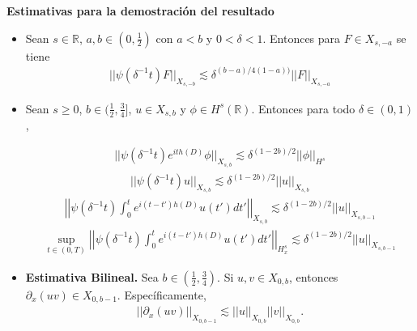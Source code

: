 \documentclass[a0,portrait]{a0poster}
\begin{document}
\begin{multicols}{2}
{{{\begin{minipage}{.93\columnwidth}
\textbf{Estimativas para la demostración del resultado}
\begin{itemize}
    \item Sean $s \in \mathbb{R}$, $a,b \in (0,\frac{1}{2})$ con $a<b$ y $0<\delta<1$. Entonces para $F \in X_{s,-a}$ se tiene
    \begin{align*}
        ||\psi(\delta^{-1}t)F||_{X_{s,-b}} \lesssim \delta^{(b-a)/4(1-a))}||F||_{X_{s,-a}}
    \end{align*}

    \item Sean $s \geq 0$, $b \in (\frac{1}{2},\frac{3}{4}]$, $u\in X_{s,b}$ y $\phi \in H^s(\mathbb{R})$. Entonces para todo $\delta \in (0,1)$,
    
    \begin{multicols}{2}
    {\small
        \begin{align*}
            ||\psi(\delta^{-1}t)e^{ith(D)}\phi||_{X_{s,b}} \lesssim \delta^{(1-2b)/2}||\phi||_{H^s}
        \end{align*}
        \begin{align*}
            ||\psi(\delta^{-1}t)u||_{X_{s,b}} \lesssim \delta^{(1-2b)/2}||u||_{X_{s,b}}
        \end{align*}
        \begin{align*}
          \left|\left|\psi(\delta^{-1}t)\int_0^t e^{i(t-t')h(D)}u(t')dt'\right|\right|_{X_{s,b}} \lesssim \delta^{(1-2b)/2}||u||_{X_{s,b-1}}
        \end{align*}
        \begin{align*}
          \sup_{t\in (0,T)} \left|\left| \psi(\delta^{-1}t)\int_0^te^{i(t-t')h(D)}u(t')dt'\right|\right|_{H_x^s} \lesssim \delta^{(1-2b)/2}||u||_{X_{s,b-1}}
        \end{align*}
        }
    \end{multicols}
    \item \textbf{Estimativa Bilineal.} Sea $b\in (\frac{1}{2},\frac{3}{4})$. Si $u,v \in X_{0,b}$, entonces $\partial_x(uv) \in X_{0,b-1}$. Específicamente,
    \begin{align}
        ||\partial_x(uv)||_{X_{0,b-1}} \lesssim ||u||_{X_{0,b}}||v||_{X_{0,b}}.
    \end{align}
\end{itemize}

\bigskip
\end{minipage}}}}\\
\vspace{-1.5cm}


\end{multicols}
\end{document}
